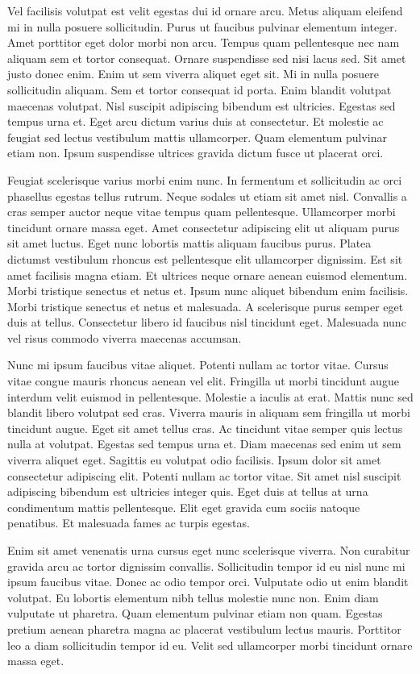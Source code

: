 Vel facilisis volutpat est velit egestas dui id ornare arcu. Metus aliquam eleifend mi in nulla posuere sollicitudin. Purus ut faucibus pulvinar elementum integer. Amet porttitor eget dolor morbi non arcu. Tempus quam pellentesque nec nam aliquam sem et tortor consequat. Ornare suspendisse sed nisi lacus sed. Sit amet justo donec enim. Enim ut sem viverra aliquet eget sit. Mi in nulla posuere sollicitudin aliquam. Sem et tortor consequat id porta. Enim blandit volutpat maecenas volutpat. Nisl suscipit adipiscing bibendum est ultricies. Egestas sed tempus urna et. Eget arcu dictum varius duis at consectetur. Et molestie ac feugiat sed lectus vestibulum mattis ullamcorper. Quam elementum pulvinar etiam non. Ipsum suspendisse ultrices gravida dictum fusce ut placerat orci.

Feugiat scelerisque varius morbi enim nunc. In fermentum et sollicitudin ac orci phasellus egestas tellus rutrum. Neque sodales ut etiam sit amet nisl. Convallis a cras semper auctor neque vitae tempus quam pellentesque. Ullamcorper morbi tincidunt ornare massa eget. Amet consectetur adipiscing elit ut aliquam purus sit amet luctus. Eget nunc lobortis mattis aliquam faucibus purus. Platea dictumst vestibulum rhoncus est pellentesque elit ullamcorper dignissim. Est sit amet facilisis magna etiam. Et ultrices neque ornare aenean euismod elementum. Morbi tristique senectus et netus et. Ipsum nunc aliquet bibendum enim facilisis. Morbi tristique senectus et netus et malesuada. A scelerisque purus semper eget duis at tellus. Consectetur libero id faucibus nisl tincidunt eget. Malesuada nunc vel risus commodo viverra maecenas accumsan.

Nunc mi ipsum faucibus vitae aliquet. Potenti nullam ac tortor vitae. Cursus vitae congue mauris rhoncus aenean vel elit. Fringilla ut morbi tincidunt augue interdum velit euismod in pellentesque. Molestie a iaculis at erat. Mattis nunc sed blandit libero volutpat sed cras. Viverra mauris in aliquam sem fringilla ut morbi tincidunt augue. Eget sit amet tellus cras. Ac tincidunt vitae semper quis lectus nulla at volutpat. Egestas sed tempus urna et. Diam maecenas sed enim ut sem viverra aliquet eget. Sagittis eu volutpat odio facilisis. Ipsum dolor sit amet consectetur adipiscing elit. Potenti nullam ac tortor vitae. Sit amet nisl suscipit adipiscing bibendum est ultricies integer quis. Eget duis at tellus at urna condimentum mattis pellentesque. Elit eget gravida cum sociis natoque penatibus. Et malesuada fames ac turpis egestas.

Enim sit amet venenatis urna cursus eget nunc scelerisque viverra. Non curabitur gravida arcu ac tortor dignissim convallis. Sollicitudin tempor id eu nisl nunc mi ipsum faucibus vitae. Donec ac odio tempor orci. Vulputate odio ut enim blandit volutpat. Eu lobortis elementum nibh tellus molestie nunc non. Enim diam vulputate ut pharetra. Quam elementum pulvinar etiam non quam. Egestas pretium aenean pharetra magna ac placerat vestibulum lectus mauris. Porttitor leo a diam sollicitudin tempor id eu. Velit sed ullamcorper morbi tincidunt ornare massa eget.

